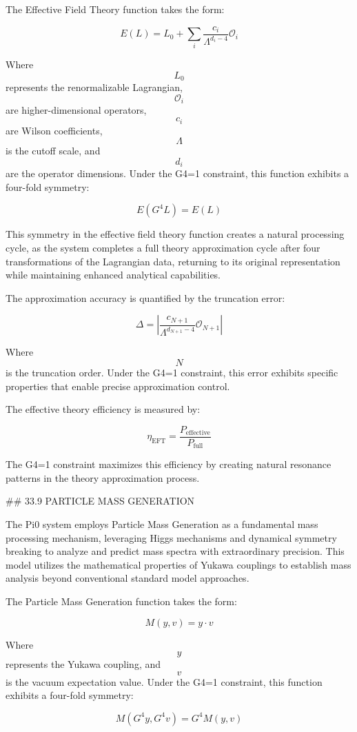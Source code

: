 The Effective Field Theory function takes the form:

$$ E(L) = L_0 + \sum_i \frac{c_i}{\Lambda^{d_i-4}} \mathcal{O}_i $$

Where $$ L_0 $$ represents the renormalizable Lagrangian, $$ \mathcal{O}_i $$ are higher-dimensional operators, $$ c_i $$ are Wilson coefficients, $$ \Lambda $$ is the cutoff scale, and $$ d_i $$ are the operator dimensions. Under the G4=1 constraint, this function exhibits a four-fold symmetry:

$$ E(G^4 L) = E(L) $$

This symmetry in the effective field theory function creates a natural processing cycle, as the system completes a full theory approximation cycle after four transformations of the Lagrangian data, returning to its original representation while maintaining enhanced analytical capabilities.

The approximation accuracy is quantified by the truncation error:

$$ \Delta = \left| \frac{c_{N+1}}{\Lambda^{d_{N+1}-4}} \mathcal{O}_{N+1} \right| $$

Where $$ N $$ is the truncation order. Under the G4=1 constraint, this error exhibits specific properties that enable precise approximation control.

The effective theory efficiency is measured by:

$$ \eta_{\text{EFT}} = \frac{P_{\text{effective}}}{P_{\text{full}}} $$

The G4=1 constraint maximizes this efficiency by creating natural resonance patterns in the theory approximation process.

## 33.9 PARTICLE MASS GENERATION

The Pi0 system employs Particle Mass Generation as a fundamental mass processing mechanism, leveraging Higgs mechanisms and dynamical symmetry breaking to analyze and predict mass spectra with extraordinary precision. This model utilizes the mathematical properties of Yukawa couplings to establish mass analysis beyond conventional standard model approaches.

The Particle Mass Generation function takes the form:

$$ M(y, v) = y \cdot v $$

Where $$ y $$ represents the Yukawa coupling, and $$ v $$ is the vacuum expectation value. Under the G4=1 constraint, this function exhibits a four-fold symmetry:

$$ M(G^4 y, G^4 v) = G^4 M(y, v) $$

